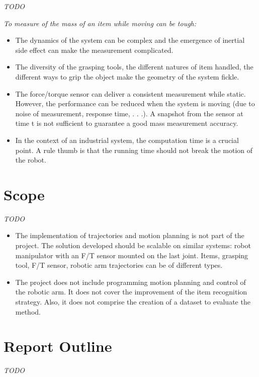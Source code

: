 \documentclass[/home/francois/latex/report/main.tex]{subfiles}
\begin{document}
\textit{TODO}

{\it
To measure of the mass of an item while moving can be tough:

\begin{itemize}
	\item The dynamics of the system can be complex and the emergence of inertial side effect can make the measurement complicated.
	\item The diversity of the grasping tools, the different natures of item handled, the different ways to grip the object make the geometry of the system fickle.
	\item The force/torque sensor can deliver a consistent measurement while static. However, the performance can be reduced when the system is moving (due to noise of measurement, response time, . . .). A snapshot from the sensor at time t is not sufficient to guarantee a good mass measurement accuracy.
	\item In the context of an industrial system, the computation time is a crucial point. A rule  thumb is that the running time should not break the motion of the robot.
\end{itemize}
}

\section{Scope}

\textit{TODO}

{\it
\begin{itemize}
	\item The implementation of trajectories and motion planning is not part of the project. The solution developed should be scalable on similar systems: robot manipulator with an F/T sensor mounted on the last joint. Items, grasping tool, F/T sensor, robotic arm trajectories can be of different types.
	\item The project does not include programming motion planning and control of the robotic arm. It does not cover the improvement of the item recognition strategy. Also, it does not comprise the creation of a dataset to evaluate the method.
\end{itemize}
}


\section{Report Outline}

\textit{TODO}

{\it

}
\end{document}
